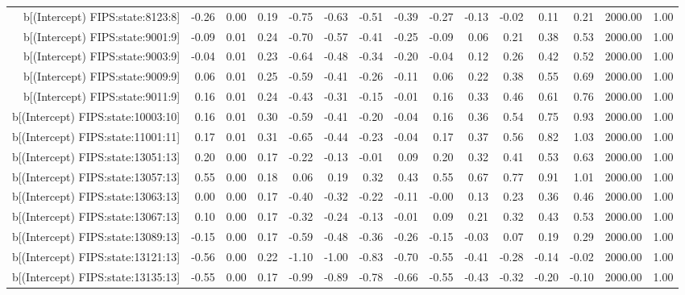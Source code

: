 \begin{table}[ht]
\begin{tabular}{rrrrrrrrrrrrrrr}
  b[(Intercept) FIPS:state:8123:8] & -0.26 & 0.00 & 0.19 & -0.75 & -0.63 & -0.51 & -0.39 & -0.27 & -0.13 & -0.02 & 0.11 & 0.21 & 2000.00 & 1.00 \\ 
  b[(Intercept) FIPS:state:9001:9] & -0.09 & 0.01 & 0.24 & -0.70 & -0.57 & -0.41 & -0.25 & -0.09 & 0.06 & 0.21 & 0.38 & 0.53 & 2000.00 & 1.00 \\ 
  b[(Intercept) FIPS:state:9003:9] & -0.04 & 0.01 & 0.23 & -0.64 & -0.48 & -0.34 & -0.20 & -0.04 & 0.12 & 0.26 & 0.42 & 0.52 & 2000.00 & 1.00 \\ 
  b[(Intercept) FIPS:state:9009:9] & 0.06 & 0.01 & 0.25 & -0.59 & -0.41 & -0.26 & -0.11 & 0.06 & 0.22 & 0.38 & 0.55 & 0.69 & 2000.00 & 1.00 \\ 
  b[(Intercept) FIPS:state:9011:9] & 0.16 & 0.01 & 0.24 & -0.43 & -0.31 & -0.15 & -0.01 & 0.16 & 0.33 & 0.46 & 0.61 & 0.76 & 2000.00 & 1.00 \\ 
  b[(Intercept) FIPS:state:10003:10] & 0.16 & 0.01 & 0.30 & -0.59 & -0.41 & -0.20 & -0.04 & 0.16 & 0.36 & 0.54 & 0.75 & 0.93 & 2000.00 & 1.00 \\ 
  b[(Intercept) FIPS:state:11001:11] & 0.17 & 0.01 & 0.31 & -0.65 & -0.44 & -0.23 & -0.04 & 0.17 & 0.37 & 0.56 & 0.82 & 1.03 & 2000.00 & 1.00 \\ 
  b[(Intercept) FIPS:state:13051:13] & 0.20 & 0.00 & 0.17 & -0.22 & -0.13 & -0.01 & 0.09 & 0.20 & 0.32 & 0.41 & 0.53 & 0.63 & 2000.00 & 1.00 \\ 
  b[(Intercept) FIPS:state:13057:13] & 0.55 & 0.00 & 0.18 & 0.06 & 0.19 & 0.32 & 0.43 & 0.55 & 0.67 & 0.77 & 0.91 & 1.01 & 2000.00 & 1.00 \\ 
  b[(Intercept) FIPS:state:13063:13] & 0.00 & 0.00 & 0.17 & -0.40 & -0.32 & -0.22 & -0.11 & -0.00 & 0.13 & 0.23 & 0.36 & 0.46 & 2000.00 & 1.00 \\ 
  b[(Intercept) FIPS:state:13067:13] & 0.10 & 0.00 & 0.17 & -0.32 & -0.24 & -0.13 & -0.01 & 0.09 & 0.21 & 0.32 & 0.43 & 0.53 & 2000.00 & 1.00 \\ 
  b[(Intercept) FIPS:state:13089:13] & -0.15 & 0.00 & 0.17 & -0.59 & -0.48 & -0.36 & -0.26 & -0.15 & -0.03 & 0.07 & 0.19 & 0.29 & 2000.00 & 1.00 \\ 
  b[(Intercept) FIPS:state:13121:13] & -0.56 & 0.00 & 0.22 & -1.10 & -1.00 & -0.83 & -0.70 & -0.55 & -0.41 & -0.28 & -0.14 & -0.02 & 2000.00 & 1.00 \\ 
  b[(Intercept) FIPS:state:13135:13] & -0.55 & 0.00 & 0.17 & -0.99 & -0.89 & -0.78 & -0.66 & -0.55 & -0.43 & -0.32 & -0.20 & -0.10 & 2000.00 & 1.00 \\ 

\end{tabular}
\end{table}
